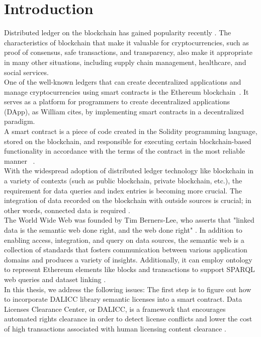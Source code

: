 \section{Introduction}
Distributed ledger on the blockchain has gained popularity recently \cite{Third}. The characteristics of blockchain that make it valuable for cryptocurrencies, such as proof of consensus, safe transactions, and transparency, also make it appropriate in many other situations, including supply chain management, healthcare, and social services. \\
One of the well-known ledgers that can create decentralized applications and manage cryptocurrencies using smart contracts is the Ethereum blockchain \cite{Third}. It serves as a platform for programmers to create decentralized applications (DApp), as William cites, by implementing smart contracts in a decentralized paradigm. \\
A smart contract is a piece of code created in the Solidity programming language, stored on the blockchain, and responsible for executing certain blockchain-based functionality in accordance with the terms of the contract in the most reliable manner  \cite{Third}. \\
With the widespread adoption of distributed ledger technology like blockchain in a variety of contexts (such as public blockchain, private blockchain, etc.), the requirement for data queries and index entries is becoming more crucial. The integration of data recorded on the blockchain with outside sources is crucial; in other words, connected data is required \cite{Third}. \\
The World Wide Web was founded by Tim Berners-Lee, who asserts that "linked data is the semantic web done right, and the web done right" \cite{Hector}. 
In addition to enabling access, integration, and query on data sources, the semantic web is a collection of standards that fosters communication between various application domains and produces a variety of insights. Additionally, it can employ ontology to represent Ethereum elements like blocks and transactions to support SPARQL web queries and dataset linking \cite{Third}. \\
In this thesis, we address the following issues: The first step is to figure out how to incorporate DALICC library semantic licenses into a smart contract. 
Data Licenses Clearance Center, or DALICC, is a framework that encourages automated rights clearance in order to detect license conflicts and lower the cost of high transactions associated with human licensing content clearance \cite{Anna}.\\
